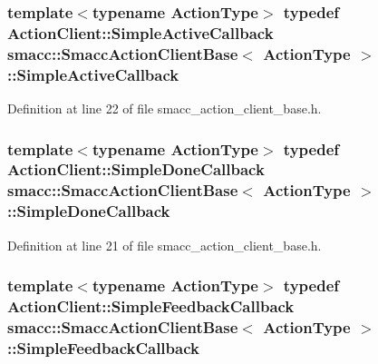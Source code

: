 \subsubsection[{\texorpdfstring{Simple\+Active\+Callback}{SimpleActiveCallback}}]{\setlength{\rightskip}{0pt plus 5cm}template$<$typename Action\+Type$>$ typedef Action\+Client\+::\+Simple\+Active\+Callback {\bf smacc\+::\+Smacc\+Action\+Client\+Base}$<$ Action\+Type $>$\+::{\bf Simple\+Active\+Callback}}\hypertarget{classsmacc_1_1SmaccActionClientBase_ab99def4cdf0522abaf5a3bf7a444cfcb}{}\label{classsmacc_1_1SmaccActionClientBase_ab99def4cdf0522abaf5a3bf7a444cfcb}


Definition at line 22 of file smacc\+\_\+action\+\_\+client\+\_\+base.\+h.

\subsubsection[{\texorpdfstring{Simple\+Done\+Callback}{SimpleDoneCallback}}]{\setlength{\rightskip}{0pt plus 5cm}template$<$typename Action\+Type$>$ typedef Action\+Client\+::\+Simple\+Done\+Callback {\bf smacc\+::\+Smacc\+Action\+Client\+Base}$<$ Action\+Type $>$\+::{\bf Simple\+Done\+Callback}}\hypertarget{classsmacc_1_1SmaccActionClientBase_a185a419026fcdbec9ddf4703a1505524}{}\label{classsmacc_1_1SmaccActionClientBase_a185a419026fcdbec9ddf4703a1505524}


Definition at line 21 of file smacc\+\_\+action\+\_\+client\+\_\+base.\+h.

\subsubsection[{\texorpdfstring{Simple\+Feedback\+Callback}{SimpleFeedbackCallback}}]{\setlength{\rightskip}{0pt plus 5cm}template$<$typename Action\+Type$>$ typedef Action\+Client\+::\+Simple\+Feedback\+Callback {\bf smacc\+::\+Smacc\+Action\+Client\+Base}$<$ Action\+Type $>$\+::{\bf Simple\+Feedback\+Callback}}\hypertarget{classsmacc_1_1SmaccActionClientBase_ad8a68f659fb23e082e75d220515c76f3}{}\label{classsmacc_1_1SmaccActionClientBase_ad8a68f659fb23e082e75d220515c76f3}


